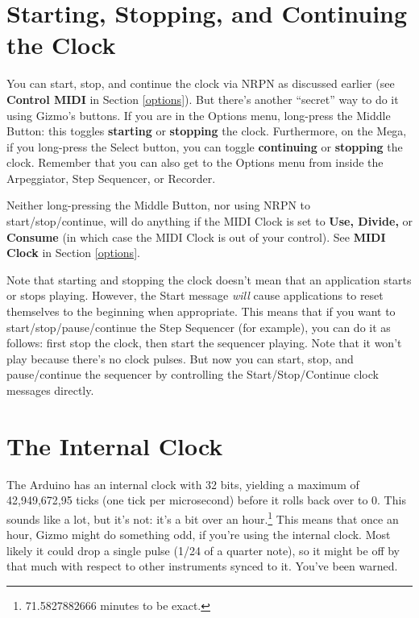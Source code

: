 \documentclass{article}
\begin{document}
	\section{Starting, Stopping, and Continuing the Clock}
	\label{startingclock}

		You can start, stop, and continue the clock via NRPN as discussed earlier (see {\bf Control MIDI} in Section \ref{options}).   But there's another ``secret'' way to do it using Gizmo's buttons.  If you are in the Options menu, long-press the Middle Button: this toggles {\bf starting} or {\bf stopping} the clock.  Furthermore, on the Mega, if you long-press the Select button, you can toggle {\bf continuing} or {\bf stopping} the clock.  Remember that you can also get to the Options menu from inside the Arpeggiator, Step Sequencer, or Recorder.
		
		Neither long-pressing the Middle Button, nor using NRPN to start/stop/continue, will do anything if the MIDI Clock is set to {\bf Use, Divide,} or {\bf Consume} (in which case the MIDI Clock is out of your control).  See {\bf MIDI Clock} in Section \ref{options}.
				
		Note that starting and stopping the clock doesn't mean that an application starts or stops playing.  However, the Start message {\it will} cause applications to reset themselves to the beginning when appropriate.   This means that if you want to start/stop/pause/continue the Step Sequencer (for example), you can do it as follows: first stop the clock, then start the sequencer playing.  Note that it won't play because there's no clock pulses.  But now you can start, stop, and pause/continue the sequencer by controlling the Start/Stop/Continue clock messages directly.
		
	\section{The Internal Clock}
	\label{internalclock}

The Arduino has an internal clock with 32 bits, yielding a maximum of 42,949,672,95 ticks (one tick per microsecond) before it rolls back over to 0.  This sounds like a lot, but it's not: it's a bit over an hour.\footnote{71.5827882666 minutes to be exact.}  This means that once an hour, Gizmo might do something odd, if you're using the internal clock.  Most likely it could drop a single pulse (1/24 of a quarter note), so it might be off by that much with respect to other instruments synced to it.  You've been warned.
\end{document}
